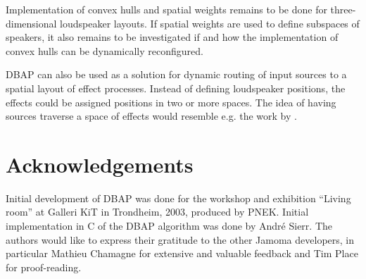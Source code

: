 \documentclass[twoside,10pt]{article}
\begin{document}
Implementation of convex hulls and spatial weights remains to be done for three-dimensional loudspeaker layouts. If spatial weights are used to define subspaces of speakers, it also remains to be investigated if and how the implementation of convex hulls can be dynamically reconfigured.


DBAP can also be used as a solution for dynamic routing of input sources to a spatial layout of effect processes. Instead of defining loudspeaker positions, the effects could be assigned positions in two or more spaces. The idea of having sources traverse a space of effects would resemble e.g. the work by \cite{Momeni:2003hipnoscope}. 


\section{Acknowledgements}

Initial development of DBAP was done for the workshop and exhibition ``Living room'' at Galleri KiT in Trondheim, 2003, produced by PNEK. Initial implementation in C of the DBAP algorithm was done by Andr\'e Sierr. The authors would like to express their gratitude to the other Jamoma developers, in particular Mathieu Chamagne for extensive and valuable feedback and Tim Place for proof-reading. 




\end{document}
